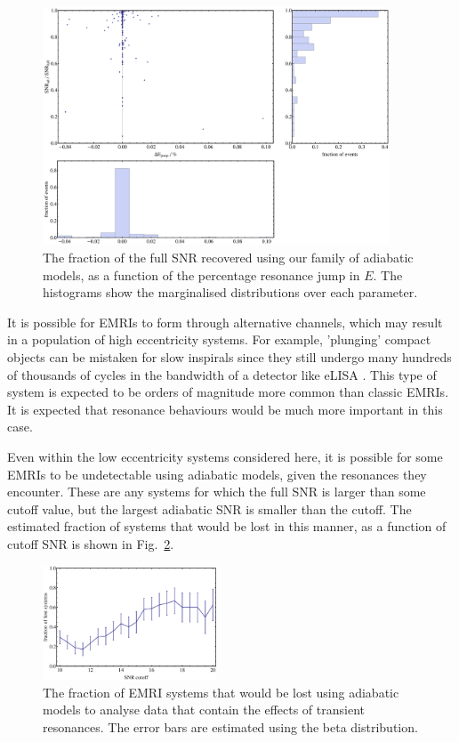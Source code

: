 \documentclass[aps,prd,amsfonts,amssymb,amsmath,nofootinbib,reprint,showpacs,superscriptaddress,twocolumn]{revtex4}
\newcommand{\figref}[1]{Fig.\ \ref{fig:#1}}
\begin{document}
\begin{figure}[htbp]
\centering
\includegraphics[width=0.92\textwidth]{Fig_pop_SNR_vs_jump}
\caption{\label{fig:pop-SNR-vs-jump}The fraction of the full SNR recovered using our family of adiabatic models, as a function of the percentage resonance jump in $E$. The histograms show the marginalised distributions over each parameter.}
\end{figure}

It is possible for EMRIs to form through alternative channels, which may result in a population of high eccentricity systems. For example, 'plunging' compact objects can be mistaken for slow inspirals since they still undergo many hundreds of thousands of cycles in the bandwidth of a detector like eLISA \cite{Amaro-Seoane2013}. This type of system is expected to be orders of magnitude more common than classic EMRIs. It is expected that resonance behaviours would be much more important in this case.

Even within the low eccentricity systems considered here, it is possible for some EMRIs to be undetectable using adiabatic models, given the resonances they encounter. These are any systems for which the full SNR is larger than some cutoff value, but the largest adiabatic SNR is smaller than the cutoff. The estimated fraction of systems that would be lost in this manner, as a function of cutoff SNR is shown in \figref{SNRcutoff}.

\begin{figure}[htbp]
\centering
\includegraphics[width=0.46\textwidth]{Fig_SNRcutoff}
\caption{\label{fig:SNRcutoff}The fraction of EMRI systems that would be lost using adiabatic models to analyse data that contain the effects of transient resonances. The error bars are estimated using the beta distribution.}
\end{figure}
\end{document}
